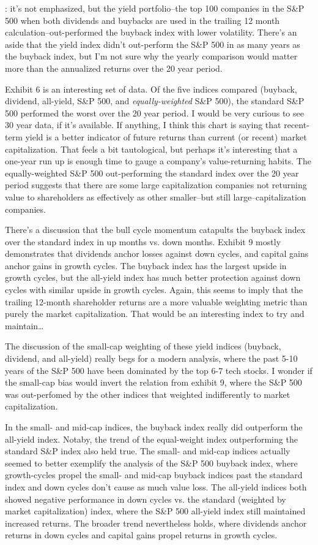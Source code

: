 : it's not emphasized, but the yield portfolio--the top 100 companies in the S\&P 500 when both dividends and buybacks are used in the trailing 12 month calculation--out-performed the buyback index with lower volatility.  There's an aside that the yield index didn't out-perform the S\&P 500 in as many years as the buyback index, but I'm not sure why the yearly comparison would matter more than the annualized returns over the 20 year period.

Exhibit 6 is an interesting set of data.  Of the five indices compared (buyback, dividend, all-yield, S\&P 500, and {\it equally-weighted} S\&P 500), the standard S\&P 500 performed the worst over the 20 year period.  I would be very curious to see 30 year data, if it's available.  If anything, I think this chart is saying that recent-term yield is a better indicator of future returns than current (or recent) market capitalization.  That feels a bit tautological, but perhaps it's interesting that a one-year run up is enough time to gauge a company's value-returning habits.  The equally-weighted S\&P 500 out-performing the standard index over the 20 year period suggests that there are some large capitalization companies not returning value to shareholders as effectively as other smaller--but still large--capitalization companies.

There's a discussion that the bull cycle momentum catapults the buyback index over the standard index in up months vs. down months.  Exhibit 9 mostly demonstrates that dividends anchor losses against down cycles, and capital gains anchor gains in growth cycles.  The buyback index has the largest upside in growth cycles, but the all-yield index has much better protection against down cycles with similar upside in growth cycles.  Again, this seems to imply that the trailing 12-month shareholder returns are a more valuable weighting metric than purely the market capitalization.  That would be an interesting index to try and maintain\ldots

The discussion of the small-cap weighting of these yield indices (buyback, dividend, and all-yield) really begs for a modern analysis, where the past 5-10 years of the S\&P 500 have been dominated by the top 6-7 tech stocks.  I wonder if the small-cap bias would invert the relation from exhibit 9, where the S\&P 500 was out-perfomed by the other indices that weighted indifferently to market capitalization.

In the small- and mid-cap indices, the buyback index really did outperform the all-yield index.  Notaby, the trend of the equal-weight index outperforming the standard S\&P index also held true.  The small- and mid-cap indices actually seemed to better exemplify the analysis of the S\&P 500 buyback index, where growth-cycles propel the small- and mid-cap buyback indices past the standard index and down cycles don't cause as much value loss.  The all-yield indices both showed negative performance in down cycles vs. the standard (weighted by market capitalization) index, where the S\&P 500 all-yield index still maintained increased returns.  The broader trend nevertheless holds, where dividends anchor returns in down cycles and capital gains propel returns in growth cycles.


